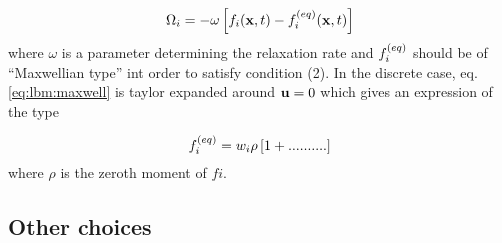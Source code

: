 \begin{equation}\label{eq:lbm:bgk}
\Omega_i = -\omega \left[ f_i(\mathbf{x}, t) - f_i^{(eq)}(\mathbf{x}, t) \right]
\end{equation}
where $\omega$ is a parameter determining the relaxation rate and
$f_i^{(eq)}$ should be of ``Maxwellian type'' int order to satisfy condition
(2). In the discrete case, eq. \eqref{eq:lbm:maxwell} is taylor
expanded around $\mathbf{u} = 0$ which gives an expression of the type

\begin{equation}
f_i^{(eq)} = w_i\rho \left [ 1 + ..........\right]
\end{equation}
where $\rho$ is the zeroth moment of $fi$.

\subsection{Other choices}
